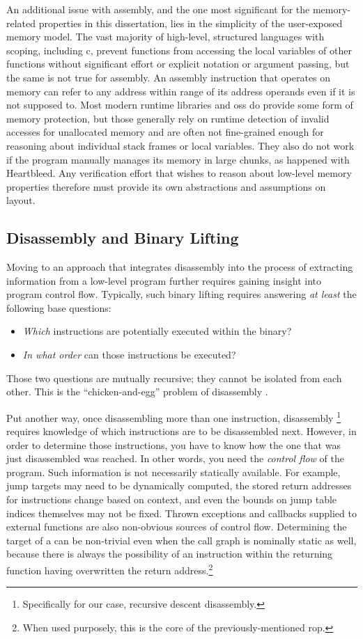 An additional issue with assembly, and the one most significant for the memory-related properties in this dissertation, lies in the simplicity of the user-exposed memory model.
The vast majority of high-level, structured languages with scoping, including \gls{c}, prevent functions from accessing the local variables of other functions without significant effort or explicit notation or argument passing, but the same is not true for assembly.
An assembly instruction that operates on memory can refer to any address within range of its address operands even if it is not supposed to.
Most modern runtime libraries and \acp{os} do provide some form of memory protection, but those generally rely on runtime detection of invalid accesses for unallocated memory and are often not fine-grained enough for reasoning about individual stack frames or local variables.
They also do not work if the program manually manages its memory in large chunks, as happened with Heartbleed.
Any verification effort that wishes to reason about low-level memory properties therefore must provide its own abstractions and assumptions on layout.

\subsection{Disassembly and Binary Lifting}\label{challenges-disassembly}
Moving to an approach that integrates disassembly into the process of extracting information from a low-level program further requires gaining insight into program control flow.
Typically, such binary lifting requires answering \emph{at least} the following base questions:
\begin{itemize}
  \item \emph{Which} instructions are potentially executed within the binary?
  \item \emph{In what order} can those instructions be executed?
\end{itemize}
Those two questions are mutually recursive; they cannot be isolated from each other.
This is the ``chicken-and-egg'' problem of disassembly \autocite{schwartz2002disassembly}.

Put another way, once disassembling more than one instruction, disassembly%
\footnote{Specifically for our case, recursive descent disassembly.}
requires knowledge of which instructions are to be disassembled next.
However, in order to determine those instructions, you have to know how the one that was just disassembled was reached.
In other words, you need the \emph{control flow} of the program.
Such information is not necessarily statically available. For example, jump targets may need to be dynamically computed, the stored return addresses for  instructions change based on context, and even the bounds on jump table indices themselves may not be fixed.
Thrown exceptions and callbacks supplied to external functions are also non-obvious sources of control flow.
Determining the target of a  can be non-trivial even when the call graph is nominally static as well, because there is always the possibility of an instruction within the returning function having overwritten the return address.\footnote{When used purposely, this is the core of the previously-mentioned \ac{rop}.}

